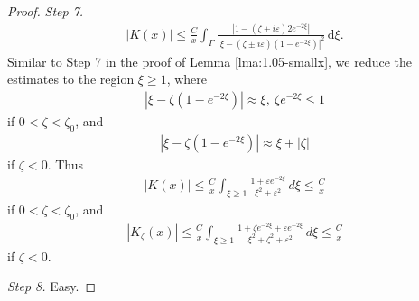 \documentclass[GreensFunctions.tex]{subfiles}
\begin{document}
\begin{proof}
	{\em Step 7.} 
	\begin{align*}
		|K(x)| 
			\le \frac{C}{x} 
				\int_\Gamma 
					\frac{|1-(\zeta\pm i\varepsilon)2e^{-2\xi}|}
						{|\xi-(\zeta\pm i\varepsilon)(1-e^{-2\xi})|^2}
				\, \mathrm{d}\xi.	
	\end{align*}
	Similar to Step 7 in the proof of Lemma \ref{lma:1.05-smallx}, we reduce the estimates to the region 
	$\xi\ge 1$, where 
	\begin{align*}
		|\xi-\zeta(1-e^{-2\xi}) |\approx \xi, ~\zeta e^{-2\xi}\le 1
	\end{align*}
	if $0<\zeta<\zeta_0$, and
	\begin{align*}
		|\xi-\zeta(1-e^{-2\xi}) |\approx \xi+|\zeta|
	\end{align*}
	if $\zeta<0$. Thus
	\begin{align*}
		|K(x)|
			\le \frac{C}{x} 
				\int_{\xi\ge 1}\frac{1+\varepsilon e^{-2\xi}}{\xi^2+\varepsilon^2 }\,d\xi 
			\le \frac{C}{x}
	\end{align*}
	if $0<\zeta<\zeta_0$, and 
	\begin{align}
		\left|K_\zeta(x)\right|
			\le \frac Cx 
				\int_{\xi\ge 1}
					\frac{1+\zeta e^{-2\xi} + \varepsilon e^{-2\xi}}
						{\xi^2+\zeta^2+\varepsilon^2 }
				\,d\xi 
			\le \frac Cx
	\end{align}
	if $\zeta<0$.

	{\em Step 8.} 
	Easy.
\end{proof}
\end{document}
